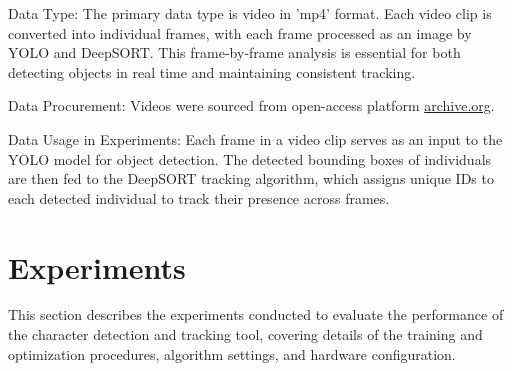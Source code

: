 \documentclass[twoside,english]{article}
\begin{document}
    Data Type: The primary data type is video in 'mp4' format. Each video clip is converted into individual frames, with each frame processed as an image by YOLO and DeepSORT. This frame-by-frame analysis is essential for both detecting objects in real time and maintaining consistent tracking.
    
    Data Procurement: Videos were sourced from open-access platform \href{https://archive.org/}{archive.org}.

    Data Usage in Experiments: Each frame in a video clip serves as an input to the YOLO model for object detection. The detected bounding boxes of individuals are then fed to the DeepSORT tracking algorithm, which assigns unique IDs to each detected individual to track their presence across frames.
  


\section{Experiments} \label{sec:exp}




    This section describes the experiments conducted to evaluate the performance of the character detection and tracking tool, covering details of the training and optimization procedures, algorithm settings, and hardware configuration.
    
    \vspace{-0.4cm}
\end{document}
